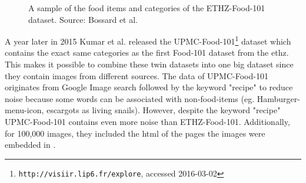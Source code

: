 \begin{figure}[htbp]
	\centering
	
	\caption{A sample of the food items and categories of the ETHZ-Food-101 dataset. Source: Bossard et al. \cite{Bossard2014}}
	\label{fig:food101Examples}
\end{figure}

A year later in 2015 Kumar et al. released the UPMC-Food-101\footnote{\texttt{http://visiir.lip6.fr/explore}, accessed 2016-03-02} dataset which contains the exact same categories as the first Food-101 dataset from the \gls{ethz}. This makes it possible to combine these twin datasets into one big dataset since they contain images from different sources. The data of UPMC-Food-101 originates from Google Image search followed by the keyword "recipe" to reduce noise because some words can be associated with non-food-items {(eg. Hamburger-menu-icon, escargots as living snails)}. However, despite the keyword "recipe" UPMC-Food-101 contains even more noise than ETHZ-Food-101. Additionally, for 100,000 images, they included the \gls{html} of the pages the images were embedded in \cite{Kumar2015}. 

